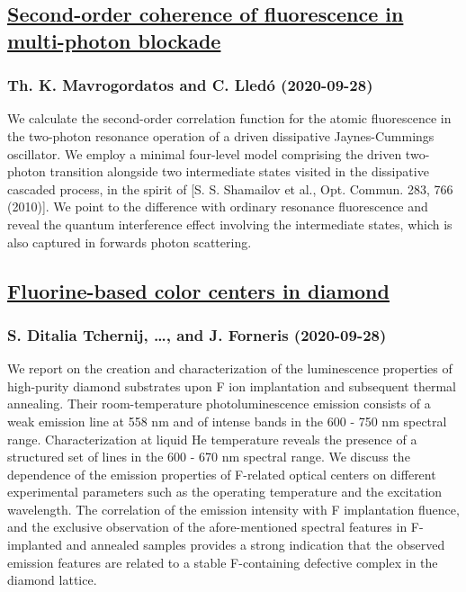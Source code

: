 \subsection*{\href{http://arxiv.org/abs/2009.13388v1}{Second-order coherence of fluorescence in multi-photon blockade}}
\subsubsection*{Th. K. Mavrogordatos and C. Lledó (2020-09-28)}
We calculate the second-order correlation function for the atomic
fluorescence in the two-photon resonance operation of a driven dissipative
Jaynes-Cummings oscillator. We employ a minimal four-level model comprising the
driven two-photon transition alongside two intermediate states visited in the
dissipative cascaded process, in the spirit of [S. S. Shamailov et al., Opt.
Commun. 283, 766 (2010)]. We point to the difference with ordinary resonance
fluorescence and reveal the quantum interference effect involving the
intermediate states, which is also captured in forwards photon scattering.

\subsection*{\href{http://arxiv.org/abs/2009.13385v1}{Fluorine-based color centers in diamond}}
\subsubsection*{S. Ditalia Tchernij, \dots, and J. Forneris (2020-09-28)}
We report on the creation and characterization of the luminescence properties
of high-purity diamond substrates upon F ion implantation and subsequent
thermal annealing. Their room-temperature photoluminescence emission consists
of a weak emission line at 558 nm and of intense bands in the 600 - 750 nm
spectral range. Characterization at liquid He temperature reveals the presence
of a structured set of lines in the 600 - 670 nm spectral range. We discuss the
dependence of the emission properties of F-related optical centers on different
experimental parameters such as the operating temperature and the excitation
wavelength. The correlation of the emission intensity with F implantation
fluence, and the exclusive observation of the afore-mentioned spectral features
in F-implanted and annealed samples provides a strong indication that the
observed emission features are related to a stable F-containing defective
complex in the diamond lattice.

